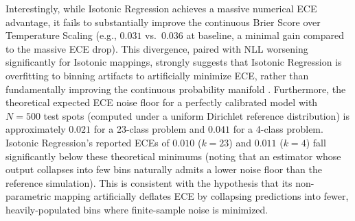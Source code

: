 \documentclass{jmlr} %
\begin{document}
Interestingly, while Isotonic Regression achieves a massive numerical ECE advantage, it fails to substantially improve the continuous Brier Score over Temperature Scaling (e.g., $0.031$ vs.\ $0.036$ at baseline, a minimal gain compared to the massive ECE drop). This divergence, paired with NLL worsening significantly for Isotonic mappings, strongly suggests that Isotonic Regression is overfitting to binning artifacts to artificially minimize ECE, rather than fundamentally improving the continuous probability manifold \citep{roelofs2022mitigating, kumar2019calibration}. Furthermore, the theoretical expected ECE noise floor for a perfectly calibrated model with $N=500$ test spots (computed under a uniform Dirichlet reference distribution) is approximately $0.021$ for a 23-class problem and $0.041$ for a 4-class problem. Isotonic Regression's reported ECEs of $0.010$ ($k=23$) and $0.011$ ($k=4$) fall significantly below these theoretical minimums (noting that an estimator whose output collapses into few bins naturally admits a lower noise floor than the reference simulation). This is consistent with the hypothesis that its non-parametric mapping artificially deflates ECE by collapsing predictions into fewer, heavily-populated bins where finite-sample noise is minimized.
\end{document}
